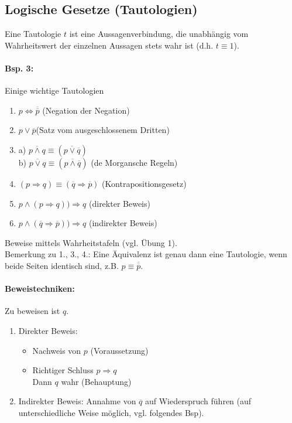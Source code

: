 \subsection{Logische Gesetze (Tautologien)}
Eine Tautologie $t$ ist eine Aussagenverbindung, die unabhängig vom Wahrheitswert der einzelnen Aussagen stets wahr ist (d.h. $t\equiv 1$).
\paragraph{Bsp. 3:}\parskp
Einige wichtige Tautologien
\begin{enumerate}
\item $p\Leftrightarrow \overline{\overline{p}}$ \tab \tab(Negation der Negation)
\item $p \vee \overline{p}$\tab \tab (Satz vom ausgeschlossenem Dritten)
\item a) $\overline{p\wedge q} \equiv (\overline{p \vee \overline{q}})$\\
b) $\overline{p\vee q} \equiv (\overline{p \wedge \overline{q}})$ \tab(de Morgansche Regeln)
\item $(p\Rightarrow q) \equiv (\overline{q} \Rightarrow \overline{p})$ \tab(Kontrapositionsgesetz)
\item $p\wedge (p\Rightarrow q)) \Rightarrow q$ \tab(direkter Beweis)
\item $p\wedge (\overline{q} \Rightarrow \overline{p})) \Rightarrow q$ \tab(indirekter Beweis)
\end{enumerate}
Beweise mittels Wahrheitstafeln (vgl. Übung 1).\\
Bemerkung zu 1., 3., 4.: Eine Äquivalenz ist genau dann eine Tautologie, wenn beide Seiten identisch sind, z.B. $p\equiv \overline{\overline{p}}$.

\paragraph{Beweistechniken:} \parskp
Zu beweisen ist $q$.
\begin{enumerate}
\item Direkter Beweis:
\begin{itemize}
\item Nachweis von $p$ (Voraussetzung)
\item Richtiger Schluss $p\Rightarrow q$\\
Dann $q$ wahr (Behauptung)
\end{itemize}
\item Indirekter Beweis: Annahme von $\overline{q}$ auf Wiederspruch führen (auf unterschiedliche Weise möglich, vgl. folgendes Bsp).
\end{enumerate}

